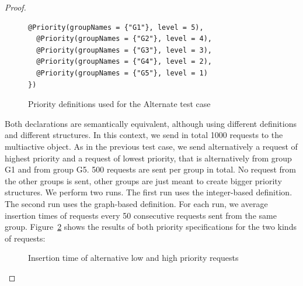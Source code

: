 \documentclass[11pt]{report}
\begin{document}
\begin{proof}
\begin{figure}[!ht]
\begin{minipage}{0.57\textwidth}
\begin{lstlisting}[frame=single]
  @Priority(groupNames = {"G1"}, level = 5),
  @Priority(groupNames = {"G2"}, level = 4),
  @Priority(groupNames = {"G3"}, level = 3),
  @Priority(groupNames = {"G4"}, level = 2),
  @Priority(groupNames = {"G5"}, level = 1)
})
 	\end{lstlisting}
 	\end{minipage}	
	\caption{Priority definitions used for the Alternate test case}
	\label{fig:alternate-decl}
\end{figure}

Both declarations are semantically equivalent, although using different definitions and different structures. In this context, we send in total 1000 requests to the multiactive object. As in the previous test case, we send alternatively a request of highest priority and a request of lowest priority, that is alternatively from group G1 and from group G5. 500 requests are sent per group in total. No request from the other groups is sent, other groups are just meant to create bigger priority structures. We perform two runs. The first run uses the integer-based definition. The second run uses the graph-based definition. For each run, we average insertion times of requests every 50 consecutive requests sent from the same group. Figure~\ref{fig:alternate} shows the results of both priority specifications for the two kinds of requests:

\begin{figure}[!ht]
      \caption{Insertion time of alternative low and high priority requests}
      \label{fig:alternate} 
\end{figure}


\end{proof}
\end{document}
